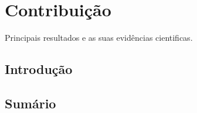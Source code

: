 \chapter{Contribuição}

Principais resultados e as suas evidências cientificas.

\section{Introdução}

\section{Sumário}